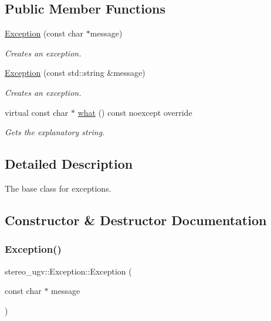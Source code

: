 \subsection*{Public Member Functions}
\begin{DoxyCompactItemize}
\item 
\hyperlink{classstereo__ugv_1_1Exception_a70f09c97d92872832efce71bd37aabce}{Exception} (const char $\ast$message)
\begin{DoxyCompactList}\small\item\em Creates an exception. \end{DoxyCompactList}\item 
\hyperlink{classstereo__ugv_1_1Exception_a8d813f3fb347af4b3682c2a4bc22d59b}{Exception} (const std\+::string \&message)
\begin{DoxyCompactList}\small\item\em Creates an exception. \end{DoxyCompactList}\item 
virtual const char $\ast$ \hyperlink{classstereo__ugv_1_1Exception_a6222ba0a0cd622e7b560f8dcadf2ec87}{what} () const noexcept override
\begin{DoxyCompactList}\small\item\em Gets the explanatory string. \end{DoxyCompactList}\end{DoxyCompactItemize}


\subsection{Detailed Description}
The base class for exceptions. 

\subsection{Constructor \& Destructor Documentation}
\mbox{\label{classstereo__ugv_1_1Exception_a70f09c97d92872832efce71bd37aabce}} 
\subsubsection{\texorpdfstring{Exception()}{Exception()}\hspace{0.1cm}{\footnotesize\ttfamily [1/2]}}
{\footnotesize\ttfamily stereo\+\_\+ugv\+::\+Exception\+::\+Exception (\begin{DoxyParamCaption}\item[{const char $\ast$}]{message }\end{DoxyParamCaption})}



